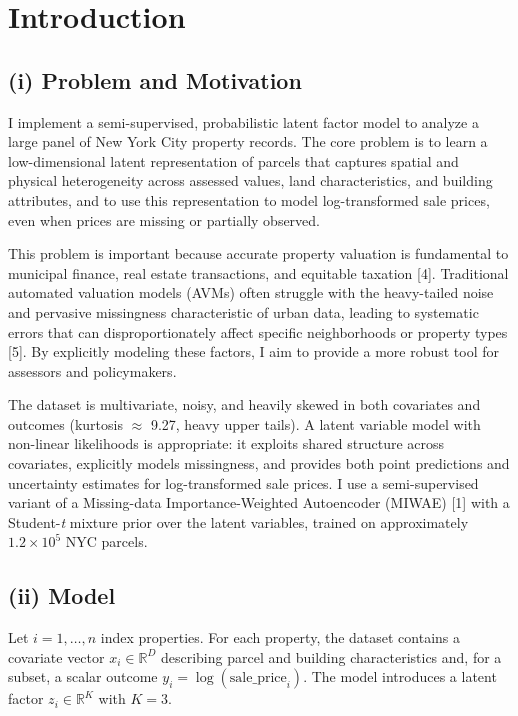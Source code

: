 \documentclass[11pt]{article}
\begin{document}
\section*{Introduction}

\subsection*{(i) Problem and Motivation}

I implement a semi-supervised, probabilistic latent factor model to analyze a large panel of New York City property records. The core problem is to learn a low-dimensional latent representation of parcels that captures spatial and physical heterogeneity across assessed values, land characteristics, and building attributes, and to use this representation to model log-transformed sale prices, even when prices are missing or partially observed.

This problem is important because accurate property valuation is fundamental to municipal finance, real estate transactions, and equitable taxation [4]. Traditional automated valuation models (AVMs) often struggle with the heavy-tailed noise and pervasive missingness characteristic of urban data, leading to systematic errors that can disproportionately affect specific neighborhoods or property types [5]. By explicitly modeling these factors, I aim to provide a more robust tool for assessors and policymakers.

The dataset is multivariate, noisy, and heavily skewed in both covariates and outcomes (kurtosis $\approx$ 9.27, heavy upper tails). A latent variable model with non-linear likelihoods is appropriate: it exploits shared structure across covariates, explicitly models missingness, and provides both point predictions and uncertainty estimates for log-transformed sale prices. I use a semi-supervised variant of a Missing-data Importance-Weighted Autoencoder (MIWAE) [1] with a Student-\emph{t} mixture prior over the latent variables, trained on approximately $1.2\times 10^5$ NYC parcels.

\subsection*{(ii) Model}

Let $i = 1,\dots, n$ index properties. For each property, the dataset contains a covariate vector $x_i \in \mathbb{R}^D$ describing parcel and building characteristics and, for a subset, a scalar outcome $y_i = \log(\text{sale\_price}_i)$. The model introduces a latent factor $z_i \in \mathbb{R}^K$ with $K = 3$.
\end{document}
